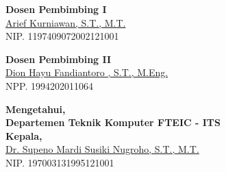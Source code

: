 \vspace{1.5cm}
\begin{center}
  \begin{minipage}{.45\linewidth}
    \begin{flushleft}
	\begin{center}
      \textbf{Dosen Pembimbing I} \\
      \vspace{1.5cm}
       \underline{ Arief Kurniawan, S.T., M.T.} \\
	NIP. 1197409072002121001
	\end{center} 
    \end{flushleft}
  \end{minipage}
  \hfill
  \begin{minipage}{.45\linewidth}
    \begin{flushleft}
	\begin{center}
      \textbf{Dosen Pembimbing II} \\
      \vspace{1.5cm}
       \underline{Dion Hayu Fandiantoro , S.T., M.Eng.} \\
	NPP. 1994202011064
	\end{center} 
    \end{flushleft}
  \end{minipage}
\end{center}

\vspace{1cm}

\begin{center}
  \begin{minipage}{.50\linewidth}
	\begin{center}
      \textbf{Mengetahui,} \\
	\textbf{Departemen Teknik Komputer FTEIC - ITS} \\
	\textbf{Kepala,}\\
      \vspace{1.5cm}
       \underline{ Dr. Supeno Mardi Susiki Nugroho, S.T., M.T.} \\
	NIP. 197003131995121001
	\end{center} 
  \end{minipage}
\end{center}